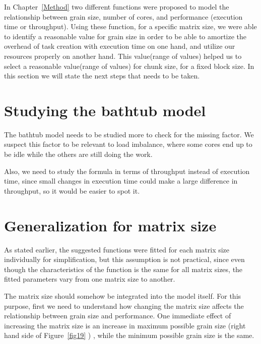 
In Chapter~\ref{Method} two different functions were proposed to model the relationship between grain size, number of cores, and performance (execution time or throughput). Using these function, for a specific matrix size, we were able to identify a reasonable value for grain size in order to be able to amortize the overhead of task creation with execution time on one hand, and utilize our resources properly on another hand. This value(range of values) helped us to select a reasonable value(range of values) for chunk size, for a fixed block size.
In this section we will state the next steps that needs to be taken.
\vspace{\baselineskip}	
\section{Studying the bathtub model}
The bathtub model needs to be studied more to check for the missing factor. We suspect this factor to be relevant to load imbalance, where some cores end up to be idle while the others are still doing the work. 

Also, we need to study the formula in terms of throughput instead of execution time, since small changes in execution time could make a large difference in throughput, so it would be easier to spot it.

\vspace{\baselineskip}		
\section{Generalization for matrix size}
As stated earlier, the suggested functions were fitted for each matrix size individually for simplification, but this assumption is not practical, since even though the characteristics of the function is the same for all matrix sizes, the fitted parameters vary from one matrix size to another. 

The matrix size should somehow be integrated into the model itself. For this purpose, first we need to understand how changing the matrix size affects the relationship between grain size and performance. 
One immediate effect of increasing the matrix size is an increase in maximum possible grain size (right hand side of Figure~\ref{fig19} ) , while the minimum possible grain size is the same.

